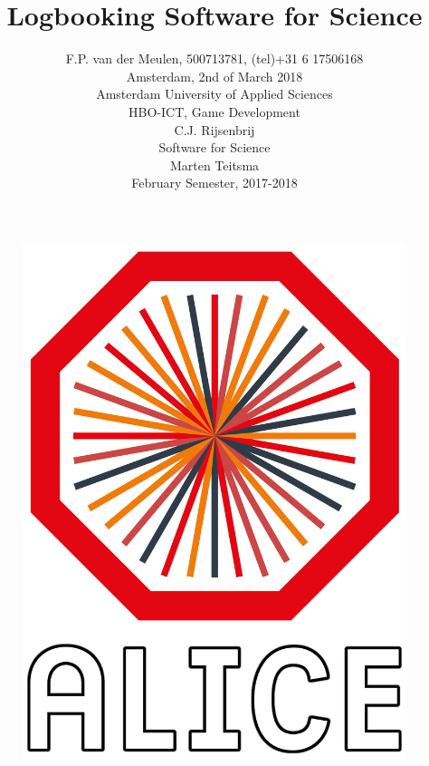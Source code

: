 \documentclass[paper=a4, fontsize=11pt,twoside]{scrartcl}	%
\title{Logbooking Software for Science}
\author{
		F.P. van der Meulen, 500713781, (tel)+31 6 17506168\\
		Amsterdam, 2nd of March 2018\\	
		Amsterdam University of Applied Sciences\\
		HBO-ICT, Game Development\\
		C.J. Rijsenbrij\\	
		Software for Science\\
		Marten Teitsma\\
		February Semester, 2017-2018\\
}
\makeatletter
\def\printauthor{%
    {\centering \large \@author}}
\makeatother
\begin{document}
\lstset{language= Java}

\thispagestyle{empty}		%

\maketitle
\begin{figure}[H]
\centering
\includegraphics[scale=0.5]{alice}
\end{figure}

\thispagestyle{empty}

\newpage 
\printauthor

\newpage



\newpage
\tableofcontents

\newpage
\end{document}
